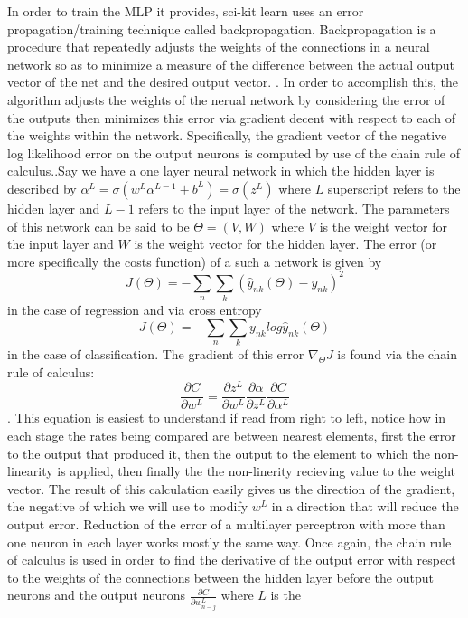 {{In order to train the MLP it provides, sci-kit learn uses an error
propagation/training technique called backpropagation. Backpropagation
is a procedure that repeatedly adjusts the weights of the connections
in a neural network so as to minimize a measure of the difference
between the actual output vector of the net and the desired output
vector. \cite{Rumelhart}. In order to accomplish this, the algorithm
adjusts the weights of the nerual network by considering the error of
the outputs then minimizes this error via gradient decent with respect
to each of the weights within the network. Specifically, the gradient
vector of the negative log likelihood error on the output neurons is
computed by use of the chain rule of calculus.\cite{Murphy}.Say we
have a one layer neural network in which the hidden layer is described
by $\alpha^{L} = \sigma(w^{L}\alpha^{L-1} + b^{L}) = \sigma(z^{L})$
where $L$ superscript refers to the hidden layer and $L-1$ refers
to the input layer of the network. The parameters of this network can
be said to be $\Theta = (V,W)$ where $V$ is the weight vector for the input
layer and $W$ is the weight vector for the hidden layer. The error (or
more specifically the costs function) of a such a network is given by $$J(\Theta ) =
- \sum_n\sum_k(\hat{y}_{nk}(\Theta)-y_{nk})^2$$ in the case of
regression and via cross entropy $$J(\Theta ) =
- \sum_n\sum_ky_{nk}log\hat{y}_{nk}(\Theta)$$ in the case of
classification. The gradient of this error $\nabla_{\Theta}J$ is
found via the chain rule of calculus: $$\frac{\partial C}{\partial
w^{L}} = \frac{\partial z^{L}}{\partial
w^{L}}\frac{\partial \alpha}{\partial z^{L}}\frac{\partial
C}{\partial \alpha^{L}}$$. This equation is easiest to understand if
read from right to left, notice how in each stage the rates being
compared are between nearest elements, first the error to the output
that produced it, then the output to the element to which the
non-linearity is applied, then finally the the non-linerity recieving
value to the weight vector. The result of this calculation easily
gives us the direction of the gradient, the negative of which we will
use to modify $w^{L}$ in a direction that will reduce the output
error. Reduction of the error of a multilayer perceptron with more
than one neuron in each layer works mostly the same way. Once again,
the chain rule of calculus is used in order to find the derivative of
the output error with respect to the weights of the connections
between the hidden layer before the output neurons and the output
neurons $\frac{\partial C}{\partial w^{L}_{n-j}}$ where $L$ is the
}}
